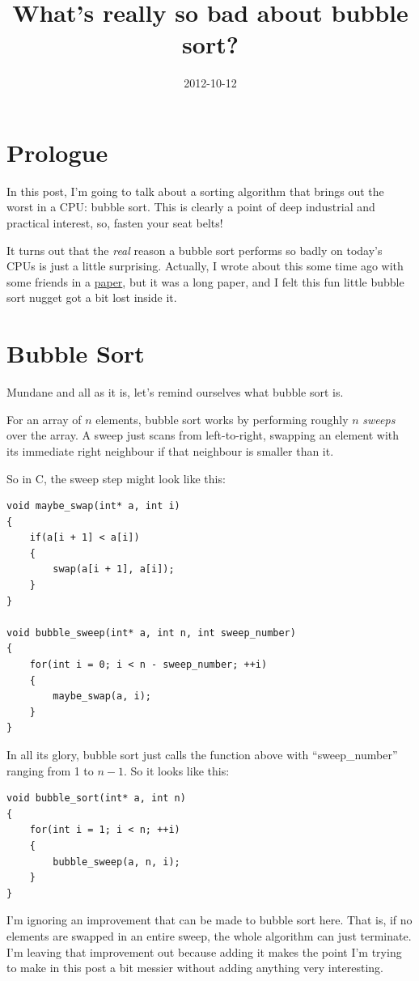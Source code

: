 \documentclass[11pt]{article}
\title{What's really so bad about bubble sort?}
\date{2012-10-12}
\begin{document}
\section{Prologue}

In this post, I'm going to talk about a sorting algorithm that brings out the worst in a CPU: bubble sort. This is clearly a point of deep industrial and practical interest, so, fasten your seat belts!

It turns out that the \emph{real} reason a bubble sort performs so badly on today's CPUs is just a little surprising. Actually, I wrote about this some time ago with some friends in a \href{http://dl.acm.org/citation.cfm?id=1370599}{paper}, but it was a long paper, and I felt this fun little bubble sort nugget got a bit lost inside it.

\section{Bubble Sort}

Mundane and all as it is, let's remind ourselves what bubble sort is.

For an array of $n$ elements, bubble sort works by performing roughly $n$ \emph{sweeps} over the array. A sweep just scans from left-to-right, swapping an element with its immediate right neighbour if that neighbour is smaller than it.

So in C, the sweep step might look like this:

\begin{verbatim}
void maybe_swap(int* a, int i)
{
    if(a[i + 1] < a[i])
    {
        swap(a[i + 1], a[i]);
    }
}

void bubble_sweep(int* a, int n, int sweep_number)
{
    for(int i = 0; i < n - sweep_number; ++i)
    {
        maybe_swap(a, i);
    }
}
\end{verbatim}

In all its glory, bubble sort just calls the function above with ``sweep\_number'' ranging from 1 to $n - 1$. So it looks like this:

\begin{verbatim}
void bubble_sort(int* a, int n)
{
    for(int i = 1; i < n; ++i)
    {
        bubble_sweep(a, n, i);
    }
}
\end{verbatim}

I'm ignoring an improvement that can be made to bubble sort here. That is, if no elements are swapped in an entire sweep, the whole algorithm can just terminate. I'm leaving that improvement out because adding it makes the point I'm trying to make in this post a bit messier without adding anything very interesting.
\end{document}
